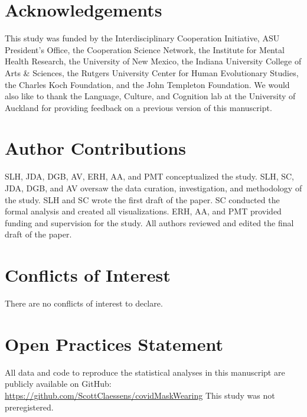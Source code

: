 \documentclass[
  man, donotrepeattitle,floatsintext]{apa6}
\begin{document}
\newpage

\hypertarget{acknowledgements}{%
\section{Acknowledgements}\label{acknowledgements}}

This study was funded by the Interdisciplinary Cooperation Initiative, ASU President's Office, the Cooperation Science Network, the Institute for Mental Health Research, the University of New Mexico, the Indiana University College of Arts \& Sciences, the Rutgers University Center for Human Evolutionary Studies, the Charles Koch Foundation, and the John Templeton Foundation. We would also like to thank the Language, Culture, and Cognition lab at the University of Auckland for providing feedback on a previous version of this manuscript.

\hypertarget{author-contributions}{%
\section{Author Contributions}\label{author-contributions}}

SLH, JDA, DGB, AV, ERH, AA, and PMT conceptualized the study. SLH, SC, JDA, DGB, and AV oversaw the data curation, investigation, and methodology of the study. SLH and SC wrote the first draft of the paper. SC conducted the formal analysis and created all visualizations. ERH, AA, and PMT provided funding and supervision for the study. All authors reviewed and edited the final draft of the paper.

\hypertarget{conflicts-of-interest}{%
\section{Conflicts of Interest}\label{conflicts-of-interest}}

There are no conflicts of interest to declare.

\hypertarget{open-practices-statement}{%
\section{Open Practices Statement}\label{open-practices-statement}}

All data and code to reproduce the statistical analyses in this manuscript are publicly available on GitHub: \url{https://github.com/ScottClaessens/covidMaskWearing} This study was not preregistered.

\newpage
\end{document}
